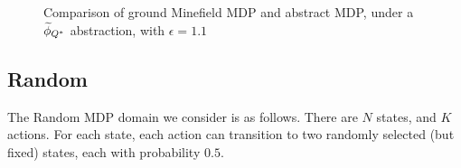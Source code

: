 \begin{figure}
\label{fig:minefield-visual}
\caption{Comparison of ground Minefield \ac{MDP} and abstract \ac{MDP}, under a $\widetilde \phi_{Q^*}$ abstraction, with $\epsilon=1.1$}
\end{figure} 


\subsection{Random}

The Random \ac{MDP} domain we consider is as follows. There are $N$ states, and $K$ actions. For each state, each action can transition to two randomly selected (but fixed) states, each with probability $0.5$.


